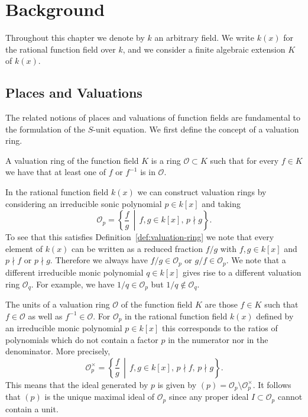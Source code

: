 
\chapter{Background}%
\label{chap:background}

Throughout this chapter we denote by \(k\) an arbitrary field. We write \(k(x)\) for the rational function field over \(k\), and we consider a finite algebraic extension \(K\) of \(k(x)\).

\section{Places and Valuations}%
\label{sec:places-and-valuations}

The related notions of places and valuations of function fields are fundamental to the formulation of the \(S\)-unit equation. We first define the concept of a valuation ring.

\begin{definition}%
  \label{def:valuation-ring}
  A valuation ring of the function field \(K\) is a ring \(\mathcal{O} \subset K\) such that for every \(f \in K\) we have that at least one of \(f\) or \(f^{-1}\) is in \(\mathcal{O}\).
\end{definition}

In the rational function field \(k(x)\) we can construct valuation rings by considering an irreducible sonic polynomial \(p \in k[x]\) and taking
\[\mathcal{O}_{p} = \left\{ \frac{f}{g} \,\middle|\, f,g \in k[x] ,\, p \nmid g \right\}.\]
To see that this satisfies Definition~\ref{def:valuation-ring} we note that every element of \(k(x)\) can be written as a reduced fraction \(f/g\) with \(f,g \in k[x]\) and \(p \nmid f\) or \(p \nmid g\). Therefore we always have \(f/g \in \mathcal{O}_{p}\) or \(g/f \in \mathcal{O}_{p}\). We note that a different irreducible monic polynomial \(q \in k[x]\) gives rise to a different valuation ring \(\mathcal{O}_{q}\). For example, we have \(1/q \in \mathcal{O}_{p}\) but \(1/q \notin \mathcal{O}_{q}\).

The units of a valuation ring \(\mathcal{O}\) of the function field \(K\) are those \(f \in K\) such that \(f \in \mathcal{O}\) as well as \(f^{-1} \in \mathcal{O}\). For \(\mathcal{O}_{p}\) in the rational function field \(k(x)\) defined by an irreducible monic polynomial \(p \in k[x]\) this corresponds to the ratios of polynomials which do not contain a factor \(p\) in the numerator nor in the denominator. More precisely,
\[\mathcal{O}_{p}^{\times} = \left\{ \frac{f}{g} \,\middle|\, f,g \in k[x] ,\, p \nmid f ,\, p \nmid g \right\}.\]
This means that the ideal generated by \(p\) is given by \((p) = \mathcal{O}_{p} \setminus \mathcal{O}_{p}^{\times}\). It follows that \((p)\) is the unique maximal ideal of \(\mathcal{O}_{p}\) since any proper ideal \(I \subset \mathcal{O}_{p}\) cannot contain a unit.

